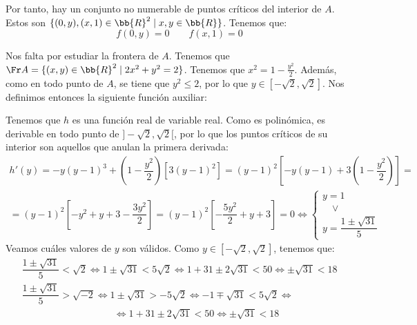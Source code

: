 \begin{ejercicio}
    Por tanto, hay un conjunto no numerable de puntos críticos del interior de $A$. Estos son $\{(0,y), (x,1)\in \bb{R}^2\mid x,y\in \bb{R}\}$. Tenemos que:
    \begin{equation*}
        f(0,y) = 0 \qquad f(x,1) = 0
    \end{equation*}

    Nos falta por estudiar la frontera de $A$. Tenemos que $\Fr A = \{(x,y)\in \bb{R}^2\mid 2x^2+y^2= 2\}$. Tenemos que $x^2 = 1-\frac{y^2}{2}$.
    Además, como en todo punto de $A$, se tiene que $y^2\leq 2$, por lo que $y\in [-\sqrt{2},\sqrt{2}]$. Nos definimos entonces la siguiente función auxiliar:

    Tenemos que $h$ es una función real de variable real. Como es polinómica, es derivable en todo punto de $]-\sqrt{2},\sqrt{2}[$, por lo que los puntos críticos de su interior son aquellos que anulan la primera derivada:
    \begin{multline*}
        h'(y) = -y(y-1)^3 + \left(1-\dfrac{y^2}{2}\right)[3(y-1)^2]
        = (y-1)^2\left[-y(y-1) + 3\left(1-\dfrac{y^2}{2}\right)\right]
        =\\= (y-1)^2\left[-y^2 + y + 3 - \dfrac{3y^2}{2}\right]
        = (y-1)^2\left[-\dfrac{5y^2}{2} + y + 3\right]
        = 0 \Longleftrightarrow
        \begin{cases}
            y=1 \\
            \quad \lor \\
            y=\dfrac{1\pm \sqrt{31}}{5}
        \end{cases}
    \end{multline*}
    Veamos cuáles valores de $y$ son válidos. Como $y\in [-\sqrt{2},\sqrt{2}]$, tenemos que:
    \begin{gather*}
        \dfrac{1\pm\sqrt{31}}{5} < \sqrt{2} \Longleftrightarrow 1 \pm \sqrt{31} < 5\sqrt{2} \Longleftrightarrow 1 + 31 \pm 2\sqrt{31} < 50 \Longleftrightarrow \pm \sqrt{31} < 18 \\
        \dfrac{1\pm\sqrt{31}}{5} > \sqrt{-2} \Longleftrightarrow 1 \pm \sqrt{31} >- 5\sqrt{2} \Longleftrightarrow -1 \mp \sqrt{31} < 5\sqrt{2} \Longleftrightarrow \\ \hspace{4cm} \Longleftrightarrow 1 + 31 \pm 2\sqrt{31} < 50 \Longleftrightarrow \pm \sqrt{31} <18
    \end{gather*}


\end{ejercicio}
